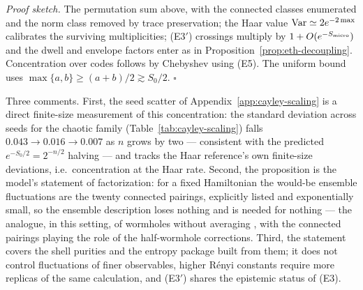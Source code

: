 \documentclass[12pt]{article}
\newcommand{\Smicro}{S_{\rm micro}}
\begin{document}
\emph{Proof sketch.}  The permutation sum above, with the connected classes
enumerated and the norm class removed by trace preservation; the Haar value
${\rm Var}\simeq2e^{-2\max}$ \cite{Giraud2007} calibrates the surviving
multiplicities; (E3$'$) crossings multiply by $1+O(e^{-\Smicro})$ and the
dwell and envelope factors enter as in
Proposition~\ref{prop:eth-decoupling}.  Concentration over codes follows by
Chebyshev using (E5).  The uniform bound uses
$\max\{a,b\}\ge(a+b)/2\gtrsim S_0/2$.  \hfill$\square$

Three comments.  First, the seed scatter of
Appendix~\ref{app:cayley-scaling} is a direct finite-size measurement of
this concentration: the standard deviation across seeds for the chaotic
family (Table~\ref{tab:cayley-scaling}) falls $0.043\to0.016\to0.007$ as $n$
grows by two --- consistent with the predicted $e^{-S_0/2}=2^{-n/2}$ halving
--- and tracks the Haar reference's own finite-size deviations, i.e.\
concentration at the Haar rate.  Second, the proposition is the model's
statement of factorization: for a fixed Hamiltonian the would-be ensemble
fluctuations are the twenty connected pairings, explicitly listed and
exponentially small, so the ensemble description loses nothing and is needed
for nothing --- the analogue, in this setting, of wormholes without
averaging \cite{SaadShenkerStanfordYao2021}, with the connected pairings
playing the role of the half-wormhole corrections.  Third, the statement
covers the shell purities and the entropy package built from them; it does
not control fluctuations of finer observables, higher R\'enyi constants
require more replicas of the same calculation, and (E3$'$) shares the
epistemic status of (E3).



\end{document}
